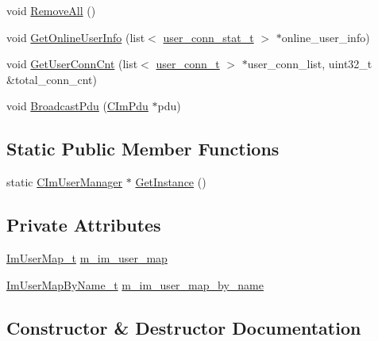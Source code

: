 \begin{DoxyCompactItemize}
\item 
void \hyperlink{class_c_im_user_manager_a32b38be0263719e1507c9ce2d602ed7d}{Remove\+All} ()
\item 
void \hyperlink{class_c_im_user_manager_a79252b502ac98aa8f56599bffabb1a83}{Get\+Online\+User\+Info} (list$<$ \hyperlink{structuser__conn__stat__t}{user\+\_\+conn\+\_\+stat\+\_\+t} $>$ $\ast$online\+\_\+user\+\_\+info)
\item 
void \hyperlink{class_c_im_user_manager_abe97bede8fe8229d2f462cffa423536c}{Get\+User\+Conn\+Cnt} (list$<$ \hyperlink{structuser__conn__t}{user\+\_\+conn\+\_\+t} $>$ $\ast$user\+\_\+conn\+\_\+list, uint32\+\_\+t \&total\+\_\+conn\+\_\+cnt)
\item 
void \hyperlink{class_c_im_user_manager_a8ec6129fdcb0602eed2d9daf16dc88ec}{Broadcast\+Pdu} (\hyperlink{class_c_im_pdu}{C\+Im\+Pdu} $\ast$pdu)
\end{DoxyCompactItemize}
\subsection*{Static Public Member Functions}
\begin{DoxyCompactItemize}
\item 
static \hyperlink{class_c_im_user_manager}{C\+Im\+User\+Manager} $\ast$ \hyperlink{class_c_im_user_manager_afe6828cff6d7dba577a3920118e5a7f3}{Get\+Instance} ()
\end{DoxyCompactItemize}
\subsection*{Private Attributes}
\begin{DoxyCompactItemize}
\item 
\hyperlink{_im_user_8h_a80f368a794e7569e3966c0bd7946dcd1}{Im\+User\+Map\+\_\+t} \hyperlink{class_c_im_user_manager_aae1ebcf35420cd07eabffa6b7b43050e}{m\+\_\+im\+\_\+user\+\_\+map}
\item 
\hyperlink{_im_user_8h_af6bb46c52b79dbd2d30637da49247c5b}{Im\+User\+Map\+By\+Name\+\_\+t} \hyperlink{class_c_im_user_manager_a196d387a08fa9627664215dbdd45ea06}{m\+\_\+im\+\_\+user\+\_\+map\+\_\+by\+\_\+name}
\end{DoxyCompactItemize}


\subsection{Constructor \& Destructor Documentation}
\hypertarget{class_c_im_user_manager_a7948f76ee16ef1ba03d6c7587df288a5}{}
